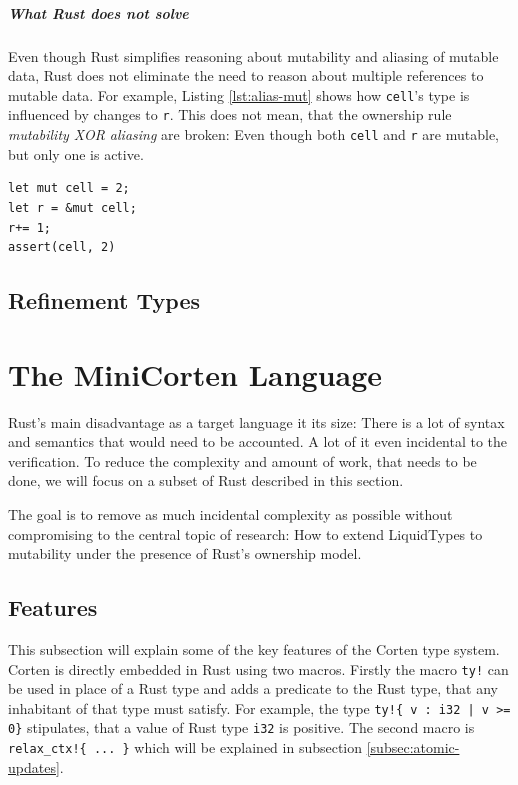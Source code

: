 \documentclass{book}
\newcommand{\code}[1]{\texttt{#1}}
\theoremstyle{definition}
\begin{document}
\paragraph*{What Rust does not solve} Even though Rust simplifies reasoning about mutability and aliasing of mutable data, Rust does not eliminate the need to reason about multiple references to mutable data. For example, Listing \ref{lst:alias-mut} shows how \code{cell}'s type is influenced by changes to \code{r}. This does not mean, that the ownership rule  \textit{mutability XOR aliasing} are broken: Even though both \code{cell} and \code{r} are mutable, but only one is active.

\label{lst:alias-mut}\begin{lstlisting}
let mut cell = 2;
let r = &mut cell;
r+= 1;
assert(cell, 2)
\end{lstlisting}

\section{Refinement Types}

\chapter{The MiniCorten Language}

Rust's main disadvantage as a target language it its size: There is a lot of syntax and semantics that would need to be accounted. A lot of it even incidental to the verification. To reduce the complexity and amount of work, that needs to be done, we will focus on a subset of Rust described in this section.

The goal is to remove as much incidental complexity as possible without compromising to the central topic of research: How to extend LiquidTypes to mutability under the presence of Rust's ownership model.

\section{Features}

This subsection will explain some of the key features of the Corten type system.
Corten is directly embedded in Rust using two macros. Firstly the macro \code{ty!} can be used in place of a Rust type and adds a predicate to the Rust type, that any inhabitant of that type must satisfy. For example, the type \code{ty!\{ v : i32 | v >= 0\}} stipulates, that a value of Rust type \code{i32} is positive. The second macro is \code{relax\_ctx!\{ ... \}} which will be explained in subsection \ref{subsec:atomic-updates}.
\end{document}
